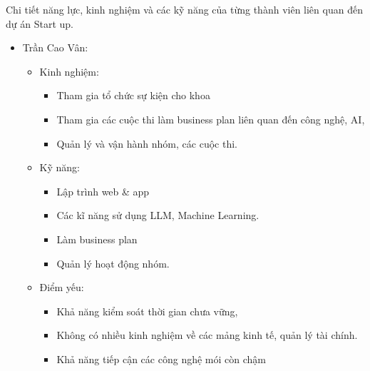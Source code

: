 Chi tiết năng lực, kinh nghiệm và các kỹ năng của từng thành viên liên quan đến dự án Start up.

\begin{itemize}
    \item Trần Cao Vân:
    \begin{itemize}
        \item Kinh nghiệm: 
        \begin{itemize}
            \item Tham gia tổ chức sự kiện cho khoa
            \item Tham gia các cuộc thi làm business plan liên quan đến công nghệ, AI, 
            \item Quản lý và vận hành nhóm, các cuộc thi.
        \end{itemize}
        \item Kỹ năng: 
        \begin{itemize}
            \item Lập trình web \& app
            \item Các kĩ năng sử dụng LLM, Machine Learning.
            \item Làm business plan 
            \item Quản lý hoạt động nhóm.
        \end{itemize}
        \item Điểm yếu: 
        \begin{itemize}
            \item Khả năng kiểm soát thời gian chưa vững, 
            \item Không có nhiều kinh nghiệm về các mảng kinh tế, quản lý tài chính.
            \item Khả năng tiếp cận các công nghệ mói còn chậm
        \end{itemize}
    \end{itemize}


\end{itemize}
